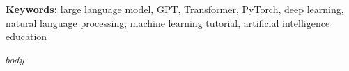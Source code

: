 \documentclass[11pt,oneside]{book}
\begin{document}
\vspace{1em}
\noindent\textbf{Keywords:} large language model, GPT, Transformer, PyTorch, deep learning,
natural language processing, machine learning tutorial, artificial intelligence education

\clearpage

\tableofcontents
\clearpage

\mainmatter

$body$
\end{document}
